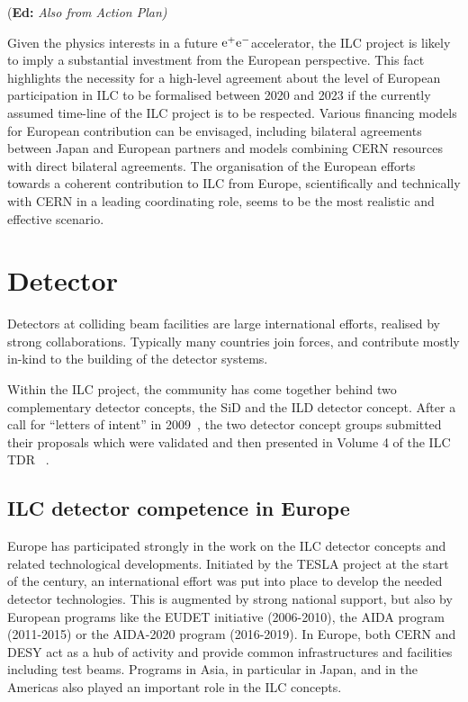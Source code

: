 \documentclass[%
 reprint,
 floatfix,
 amsmath,amssymb,
 aps,
]{revtex4-1}
\newif\ifEdNotes \EdNotestrue
\newcommand{\doednote}[1]{{\color{red}(\textbf{Ed:} \textit{#1)}}}
\newcommand{\ednote}[1]{\ifEdNotes 
  \doednote{#1} 
\fi}
\newcommand{\epem}{\mbox{${\rm e}^+{\rm e}^-$}}
\begin{document}
\ednote{Also from Action Plan}
Given the physics interests in a future \epem accelerator, the ILC project is likely to imply a substantial investment from
the European perspective. This fact highlights the necessity for a high-level
agreement about the level of European participation in ILC to be formalised between 2020
and 2023 if the currently assumed time-line of the ILC project is to be respected. Various
financing models for European contribution can be envisaged, including bilateral agreements
between Japan and European partners and models combining CERN resources with direct bilateral
agreements. The organisation of the European efforts towards a coherent contribution to ILC
from Europe, scientifically and technically with CERN in a leading coordinating role, seems to be
the most realistic and effective scenario.


\section{\label{sec:det}Detector}

Detectors at colliding beam facilities are large international efforts, realised by strong collaborations. 
Typically many countries join forces, and contribute mostly in-kind to the building of the detector systems. 

Within the ILC project, the community has come together behind two complementary detector concepts, the SiD and the ILD detector concept. 
After a call for ``letters of intent'' in 2009~\cite{Aihara:2009ad,Abe:2010aa}, the two detector concept groups submitted their proposals 
which were validated and then presented in Volume 4 of the ILC TDR ~\cite{Behnke:2013lya}.

\subsection{ILC detector competence in Europe~\label{sec:det:competence}}
Europe has participated strongly in the work on the ILC detector concepts and 
related technological developments. Initiated by the TESLA project at the start 
of the century, an international effort was put into place to develop the needed 
detector technologies. This is augmented by strong national support, but also by 
European programs like the EUDET initiative (2006-2010), the AIDA program 
(2011-2015) or the AIDA-2020 program (2016-2019). In Europe, both CERN and DESY 
act as a hub of activity and provide common infrastructures and facilities 
including test beams. Programs in Asia, in particular in Japan, and in the 
Americas also played an important role in the ILC concepts. 
\end{document}
